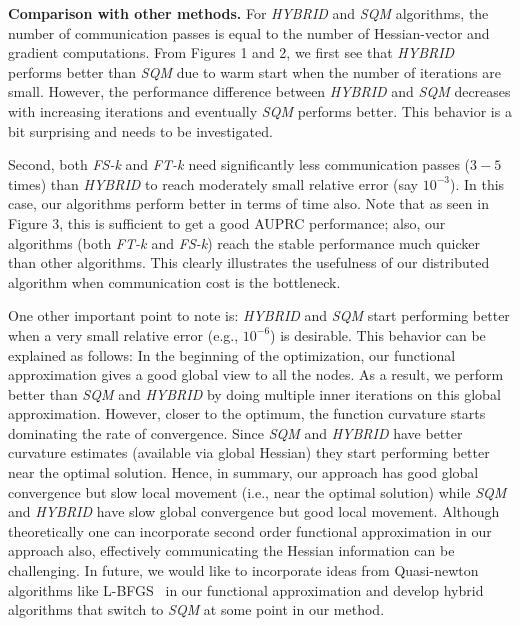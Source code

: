 {\bf Comparison with other methods. }For {\it{HYBRID}} and {\it{SQM}} algorithms, the number of communication passes is equal to the number of Hessian-vector and gradient computations. From Figures 1 and 2, we first see that {\it{HYBRID}} performs better than {\it{SQM}} due to warm start when the number of iterations are small. However, the performance difference between {\it{HYBRID}} and {\it{SQM}} decreases with increasing iterations and eventually {\it{SQM}} performs better. This behavior is a bit surprising and needs to be investigated.

Second, both {\it{FS-k}} and {\it{FT-k }} need significantly less communication passes ($3-5$ times) than {\it{HYBRID}} to reach moderately small relative error (say $10^{-3}$). In this case, our algorithms perform better in terms of time also. Note that as seen in Figure 3, this is sufficient to get a good AUPRC performance; also, our algorithms (both {\it{FT-k }} and {\it{FS-k}}) reach the stable performance much quicker than other algorithms. This clearly illustrates the usefulness of our distributed algorithm when communication cost is the bottleneck.

One other important point to note is: {\it{HYBRID}} and {\it{SQM}} start performing better when a very small relative error (e.g., $10^{-6}$) is desirable. This behavior can be explained as follows: In the beginning of the optimization, our functional approximation gives a good global view to all the nodes. As a result, we perform better than {\it{SQM}} and {\it{HYBRID}} by doing multiple inner iterations on this global approximation. However, closer to the optimum, the function curvature starts dominating the rate of convergence. Since {\it{SQM}} and {\it{HYBRID}} have better curvature estimates (available via global Hessian) they start performing better near the optimal solution. Hence, in summary, our approach has good global convergence but slow local movement (i.e., near the optimal solution) while {\it{SQM}} and {\it{HYBRID}} have slow global convergence but good local movement. Although theoretically one can incorporate second order functional approximation in our approach also, effectively communicating the Hessian information can be challenging. In future, we would like to incorporate ideas from Quasi-newton algorithms like L-BFGS~\cite{liu89} in our functional approximation and develop hybrid algorithms that switch to {\it{SQM}} at some point in our method.

